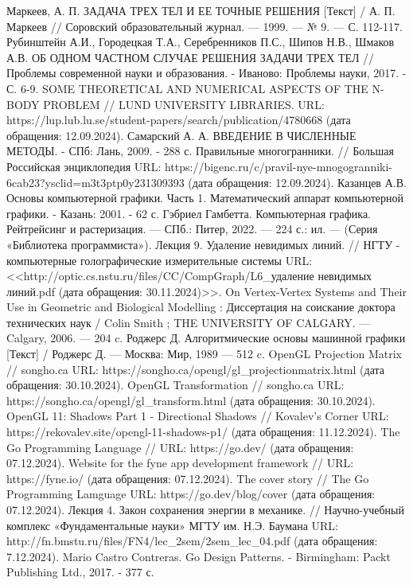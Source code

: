 \begin{thebibliography}{}
	 Маркеев, А. П. ЗАДАЧА ТРЕХ ТЕЛ И ЕЕ ТОЧНЫЕ РЕШЕНИЯ [Текст] / А. П. Маркеев // Соровский образовательный журнал. — 1999. — № 9. — С. 112-117.
	 Рубинштейн А.И., Городецкая Т.А., Серебренников П.С., Шипов Н.В., Шмаков А.В. ОБ ОДНОМ ЧАСТНОМ СЛУЧАЕ РЕШЕНИЯ ЗАДАЧИ ТРЕХ ТЕЛ // Проблемы современной науки и образования. - Иваново: Проблемы науки, 2017. - С. 6-9.
	 SOME THEORETICAL AND NUMERICAL ASPECTS OF THE N-BODY PROBLEM // LUND UNIVERSITY LIBRARIES. URL: https://lup.lub.lu.se/student-papers/search/publication/4780668 (дата обращения: 12.09.2024).
	 Самарский А. А. ВВЕДЕНИЕ В ЧИСЛЕННЫЕ МЕТОДЫ. - СПб: Лань, 2009. - 288 с.
	 Правильные многогранники. // Большая Российская энциклопедия URL: https://bigenc.ru/c/pravil-nye-mnogogranniki-6cab23?ysclid=m3t3ptp0y231309393 (дата обращения: 12.09.2024).
	 Казанцев А.В. Основы компьютерной графики. Часть 1. Математический аппарат компьютерной графики. - Казань: 2001. - 62 с.
	 Гэбриел Гамбетта. Компьютерная графика. Рейтрейсинг и растеризация. — СПб.: Питер, 2022. — 224 с.: ил. — (Серия «Библиотека программиста»).
	 Лекция 9. Удаление невидимых линий. // НГТУ - компьютерные голографические измерительные системы URL: <<http://optic.cs.nstu.ru/files/CC/CompGraph/L6\_удаление невидимых линий.pdf (дата обращения: 30.11.2024)>>.
	 On Vertex-Vertex Systems and Their Use in Geometric and Biological Modelling : Диссертация на соискание доктора технических наук / Colin Smith ; THE UNIVERSITY OF CALGARY. — Calgary, 2006. — 204 c.
	 Роджерс Д. Алгоритмические основы машинной графики [Текст] / Роджерс Д. — Москва: Мир, 1989 — 512 c.
	 OpenGL Projection Matrix // songho.ca URL: https://songho.ca/opengl/gl\_projectionmatrix.html (дата обращения: 30.10.2024).
	 OpenGL Transformation // songho.ca URL: https://songho.ca/opengl/gl\_transform.html (дата обращения: 30.10.2024).
	 OpenGL 11: Shadows Part 1 - Directional Shadows // Kovalev's Corner URL: https://rekovalev.site/opengl-11-shadows-p1/ (дата обращения: 11.12.2024).
	 The Go Programming Language // URL: https://go.dev/ (дата обращения: 07.12.2024).
	 Website for the fyne app development framework // URL: https://fyne.io/ (дата обращения: 07.12.2024).
	 The cover story // The Go Programming Lamguage URL: https://go.dev/blog/cover (дата обращения: 07.12.2024).
	 Лекция 4. Закон сохранения энергии в механике. // Научно-учебный комплекс «Фундаментальные науки» МГТУ им. Н.Э. Баумана URL: http://fn.bmstu.ru/files/FN4/lec\_2sem/2sem\_lec\_04.pdf (дата обращения: 7.12.2024).
	 Mario Castro Contreras. Go Design Patterns. - Birmingham: Packt Publishing Ltd., 2017. - 377 с.
\end{thebibliography}
